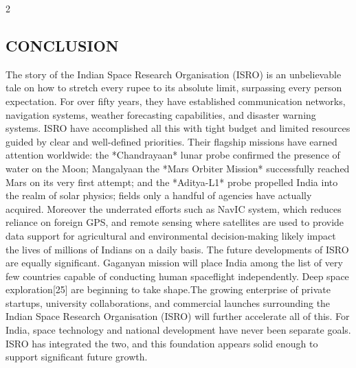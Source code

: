 \begin{multicols}{2}
  \subsection*{\centering\uppercase{CONCLUSION}}
  The story of the Indian Space Research Organisation (ISRO) is an unbelievable tale on how to stretch
  every rupee to its absolute limit, surpassing every person expectation. For over fifty years, they have
  established communication networks, navigation systems, weather forecasting capabilities, and disaster
  warning systems. ISRO have accomplished all this with tight budget and limited resources guided by
  clear and well-defined priorities. Their flagship missions have earned attention worldwide: the
  *Chandrayaan* lunar probe confirmed the presence of water on the Moon; Mangalyaan the *Mars
  Orbiter Mission* successfully reached Mars on its very first attempt; and the *Aditya-L1* probe
  propelled India into the realm of solar physics; fields only a handful of agencies have actually acquired.
  Moreover the underrated efforts such as NavIC system, which reduces reliance on foreign GPS, and
  remote sensing where satellites are used to provide data support for agricultural and environmental
  decision-making likely impact the lives of millions of Indians on a daily basis.
  The future developments of ISRO are equally significant. Gaganyan mission will place India among
  the list of very few countries capable of conducting human spaceflight independently. Deep space
  exploration[25] are beginning to take shape.The growing enterprise of private startups, university
  collaborations, and commercial launches surrounding the Indian Space Research Organisation (ISRO)
  will further accelerate all of this. For India, space technology and national development have never been
  separate goals. ISRO has integrated the two, and this foundation appears solid enough to support
  significant future growth.


\end{multicols}
